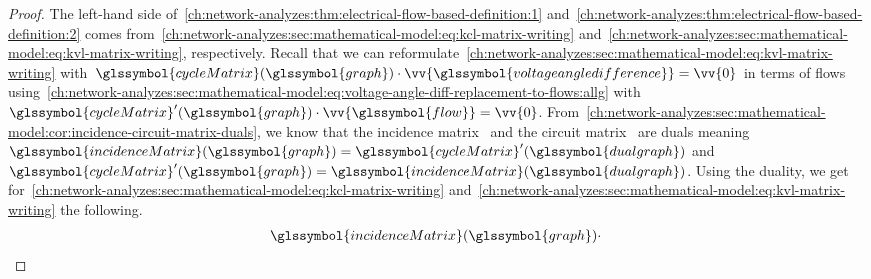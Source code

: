 % 
\begin{proof}
    The left-hand side
    of~\cref{ch:network-analyzes:thm:electrical-flow-based-definition:1}
    and~\cref{ch:network-analyzes:thm:electrical-flow-based-definition:2} comes
    from~\cref{ch:network-analyzes:sec:mathematical-model:eq:kcl-matrix-writing}
    and~\cref{ch:network-analyzes:sec:mathematical-model:eq:kvl-matrix-writing},
    respectively. Recall that we can
    reformulate~\cref{ch:network-analyzes:sec:mathematical-model:eq:kvl-matrix-writing}
    with~$
        \glssymbol{cycleMatrix}(\glssymbol{graph})
        \cdot
        \vv{\glssymbol{voltageangledifference}} 
        =
        \vv{0}
    $ in terms of flows
    using~\cref{ch:network-analyzes:sec:mathematical-model:eq:voltage-angle-diff-replacement-to-flows:allg}
    with~$
        \glssymbol{cycleMatrix}'(\glssymbol{graph})
        \cdot
        \vv{\glssymbol{flow}} 
        =
        \vv{0}
    $.
    From~\cref{ch:network-analyzes:sec:mathematical-model:cor:incidence-circuit-matrix-duals},
    we know that the incidence matrix~ and the
    circuit matrix~ are duals meaning~$
        \glssymbol{incidenceMatrix}(\glssymbol{graph}) 
        = 
        \glssymbol{cycleMatrix}'(\glssymbol{dualgraph})
    $ and~$
        \glssymbol{cycleMatrix}'(\glssymbol{graph}) 
        = 
        \glssymbol{incidenceMatrix}(\glssymbol{dualgraph})
    $. Using the duality, we get
    for~\cref{ch:network-analyzes:sec:mathematical-model:eq:kcl-matrix-writing}
    and~\cref{ch:network-analyzes:sec:mathematical-model:eq:kvl-matrix-writing}
    the following.
    \begin{subequations}
    \begin{align}
        \glssymbol{incidenceMatrix}(\glssymbol{graph})\cdot 
        \hspace{1mm}

\end{align}
\end{subequations}
\end{proof}
